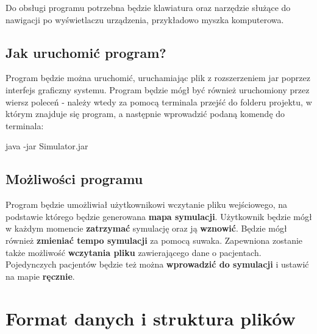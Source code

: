 \documentclass{article}
\begin{document}
    Do obsługi programu potrzebna będzie klawiatura oraz narzędzie służące do nawigacji po wyświetlaczu urządzenia, przykładowo myszka komputerowa.

    \subsection{Jak uruchomić program?}
    Program będzie można uruchomić, uruchamiając plik z rozszerzeniem jar poprzez interfejs graficzny systemu. Program będzie mógł być również uruchomiony przez wiersz poleceń - należy wtedy za pomocą terminala przejść do folderu projektu, w którym znajduje się program, a następnie wprowadzić podaną komendę do terminala:
    \begin{center}
        java -jar Simulator.jar
    \end{center}

    \subsection{Możliwości programu}
    Program będzie umożliwiał użytkownikowi wczytanie pliku wejściowego, na podstawie którego będzie generowana \textbf{mapa symulacji}. Użytkownik będzie mógł w każdym momencie \textbf{zatrzymać} symulację oraz ją \textbf{wznowić}. Będzie mógł również \textbf{zmieniać tempo symulacji} za pomocą suwaka. Zapewniona zostanie także możliwość \textbf{wczytania pliku} zawierającego dane o pacjentach. Pojedynczych pacjentów będzie też można \textbf{wprowadzić do symulacji} i ustawić na mapie \textbf{ręcznie}.

\section{Format danych i struktura plików}
\end{document}
